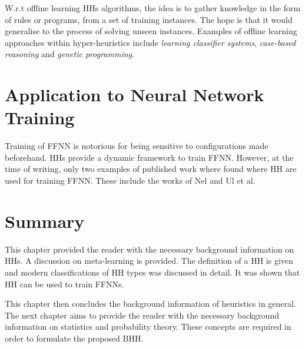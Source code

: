W.r.t offline learning \acp{HH} algorithms, the idea is to gather knowledge in the form of rules or programs, from a set of training instances. The hope is that it would generalise to the process of solving unseen instances. Examples of offline learning approaches within hyper-heuristics include \textit{learning classifier systems}, \textit{case-based reasoning} and \textit{genetic programming}.


\section{Application to Neural Network Training}
\label{sec:hh:application_to_nn_training}

Training of \ac{FFNN} is notorious for being sensitive to configurations made beforehand. \acp{HH} provide a dynamic framework to train \ac{FFNN}. However, at the time of writing, only two examples of published work where found where \ac{HH} are used for training \ac{FFNN}. These include the works of Nel \cite{ref:nel:2021} and Ul et al. \cite{ref:ul:2018}


\section{Summary}
\label{sec:hh:summary}

This chapter provided the reader with the necessary background information on \acp{HH}. A discussion on meta-learning is provided. The definition of a \ac{HH} is given and modern classifications of \ac{HH} types was discussed in detail. It was shown that \ac{HH} can be used to train \acp{FFNN}. 

This chapter then concludes the background information of heuristics in general. The next chapter aims to provide the reader with the necessary background information on statistics and probability theory. These concepts are required in order to formulate the proposed \ac{BHH}.